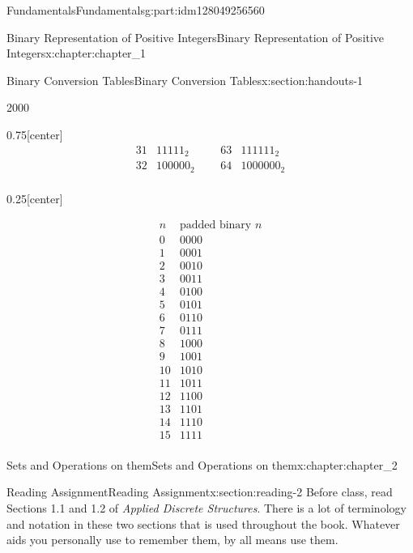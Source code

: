 \documentclass[oneside,10pt,]{book}
\numberwithin{equation}{section}
\begin{document}
\begin{partptx}{Fundamentals}{}{Fundamentals}{}{}{g:part:idm128049256560}
\begin{chapterptx}{Binary Representation of Positive Integers}{}{Binary Representation of Positive Integers}{}{}{x:chapter:chapter_1}
\begin{sectionptx}{Binary Conversion Tables}{}{Binary Conversion Tables}{}{}{x:section:handouts-1}
\begin{sidebyside}{2}{0}{0}{0}
\begin{sbspanel}{0.75}[center]
\begin{equation*}
\begin{array}{ccccc}
31 & 11111_2 & \text{     } &
63 & 111111_2 \\
32 & 100000_2 & \text{     }
& 64 & 1000000_2 \\
\end{array}
\end{equation*}
%
\end{sbspanel}%
\begin{sbspanel}{0.25}[center]%
\par
%
\begin{equation*}
\begin{array}{cc}
n & \text{padded
binary } n \\
0 & 0000 \\
1 & 0001 \\
2 & 0010 \\
3 & 0011 \\
4 & 0100 \\
5 & 0101 \\
6 & 0110 \\
7 & 0111 \\
8 & 1000 \\
9 & 1001 \\
10 & 1010 \\
11 & 1011 \\
12 & 1100 \\
13 & 1101 \\
14 & 1110 \\
15 & 1111 \\
\end{array}
\end{equation*}
%
\end{sbspanel}%
\end{sidebyside}%
\end{sectionptx}
\end{chapterptx}
%
\typeout{************************************************}
\typeout{************************************************}
%
\begin{chapterptx}{Sets and Operations on them}{}{Sets and Operations on them}{}{}{x:chapter:chapter_2}
%
%
%
\typeout{************************************************}
\typeout{************************************************}
%
\begin{sectionptx}{Reading Assignment}{}{Reading Assignment}{}{}{x:section:reading-2}
Before class, read Sections 1.1 and 1.2 of \emph{Applied Discrete Structures}. There is a lot of terminology and notation in these two sections that is used throughout the book. Whatever aids you personally use to remember them, by all means use them.%

\end{sectionptx}
\end{chapterptx}
\end{partptx}
\end{document}
